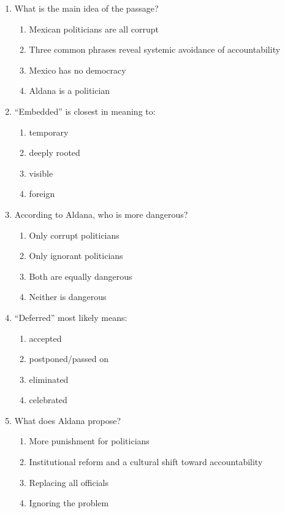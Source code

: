 \documentclass[10pt,a4paper]{article}
\begin{document}
\begin{enumerate}[label=\textbf{\arabic*.}]
\item What is the main idea of the passage?
\begin{enumerate}[label=(\Alph*)]
\item Mexican politicians are all corrupt
\item Three common phrases reveal systemic avoidance of accountability
\item Mexico has no democracy
\item Aldana is a politician
\end{enumerate}

\item ``Embedded'' is closest in meaning to:
\begin{enumerate}[label=(\Alph*)]
\item temporary \item deeply rooted \item visible \item foreign
\end{enumerate}

\item According to Aldana, who is more dangerous?
\begin{enumerate}[label=(\Alph*)]
\item Only corrupt politicians
\item Only ignorant politicians
\item Both are equally dangerous
\item Neither is dangerous
\end{enumerate}

\item ``Deferred'' most likely means:
\begin{enumerate}[label=(\Alph*)]
\item accepted \item postponed/passed on
\item eliminated \item celebrated
\end{enumerate}

\item What does Aldana propose?
\begin{enumerate}[label=(\Alph*)]
\item More punishment for politicians
\item Institutional reform and a cultural shift toward accountability
\item Replacing all officials
\item Ignoring the problem
\end{enumerate}
\end{enumerate}
\end{document}
